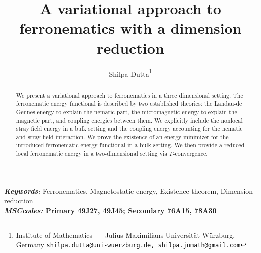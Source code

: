 \documentclass{article}
\title{A variational approach to ferronematics with a dimension reduction}
\author{
Shilpa Dutta\thanks{Institute of Mathematics\newline 
~~~Julius-Maximilians-Universität Würzburg, Germany\newline
\href{mailto:shilpa.dutta@uni-wuerzburg.de}{\texttt{shilpa.dutta@uni-wuerzburg.de, shilpa.jumath@gmail.com}}}
}
\begin{document}
\maketitle

\begin{abstract}
We present a variational approach to ferronematics in a three dimensional setting. The ferronematic energy functional is described by two established theories: the Landau-de Gennes energy to explain the nematic part, the micromagnetic energy to explain the magnetic part, and coupling energies between them. We explicitly include the nonlocal stray field energy in a bulk setting and the coupling energy accounting for the nematic and stray field interaction. We prove the existence of an energy minimizer for the introduced ferronematic energy functional in a bulk setting. We then provide a reduced local ferronematic energy in a two-dimensional setting via $\Gamma$-convergence.
\end{abstract}
\textbf{\textit{Keywords:}}
Ferronematics, Magnetostatic energy, Existence theorem, Dimension reduction
\\[0.5em]
\textbf{\textit{MSCcodes:} Primary 49J27, 49J45; Secondary 76A15, 78A30}
\end{document}
